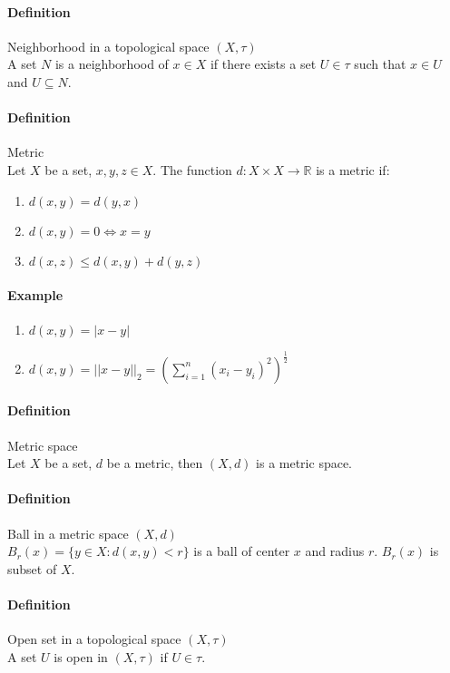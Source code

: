 \documentclass{article}
\newcommand{\abs}[1]{\left|#1\right|}
\newcommand{\R}{\mathbb{R}}
\newcommand{\Def}{\paragraph{Definition}}
\newcommand{\Example}{\paragraph{Example}}
\begin{document}
  \Def Neighborhood in a topological space $(X, \tau)$
\\A set $N$ is a neighborhood of $x \in X$ if there exists a set $U \in \tau$
  such that $x \in U$ and $U \subseteq N$.

  \Def Metric
\\Let $X$ be a set, $x, y, z \in X$. The function $d : X \times X \rightarrow
  \R$ is a metric if:
  \begin{enumerate}[label=(\roman*)]
    \item $d(x,y) = d(y,x)$
    \item $d(x,y) = 0 \iff x = y$
    \item $d(x,z) \leq d(x,y) + d(y,z)$
  \end{enumerate}

  \Example
  \begin{enumerate}[label=(\arabic*)]
    \item $d(x,y) = \abs{x - y}$
    \item $\displaystyle d(x,y) = ||x - y||_2 =
    \left(\sum_{i = 1}^n (x_i - y_i)^2\right)^{\frac{1}{2}}$
  \end{enumerate}

  \Def Metric space
\\Let $X$ be a set, $d$ be a metric, then $(X, d)$ is a metric space.

  \Def Ball in a metric space $(X, d)$
\\$B_r(x) = \{ y \in X : d(x,y) < r \}$ is a ball of center $x$ and radius $r$.
  $B_r(x)$ is subset of $X$.

  \Def Open set in a topological space $(X, \tau)$
\\A set $U$ is open in $(X, \tau)$ if $U \in \tau$.
\end{document}
